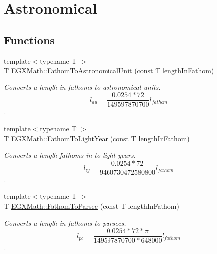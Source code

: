 \hypertarget{group___e_g_x_math-_conversions-_length_conversions-_imperial-_fathom-_astronomical}{}\section{Astronomical}
\label{group___e_g_x_math-_conversions-_length_conversions-_imperial-_fathom-_astronomical}
\subsection*{Functions}
\begin{DoxyCompactItemize}
\item 
{\footnotesize template$<$typename T $>$ }\\T \mbox{\hyperlink{group___e_g_x_math-_conversions-_length_conversions-_imperial-_fathom-_astronomical_gaf453178809cd1255a67509e03dc55f6b}{E\+G\+X\+Math\+::\+Fathom\+To\+Astronomical\+Unit}} (const T length\+In\+Fathom)
\begin{DoxyCompactList}\small\item\em Converts a length in fathoms to astronomical units. \[ l_{au}=\frac{0.0254 * 72}{149597870700} l_{fathom} \]. \end{DoxyCompactList}\item 
{\footnotesize template$<$typename T $>$ }\\T \mbox{\hyperlink{group___e_g_x_math-_conversions-_length_conversions-_imperial-_fathom-_astronomical_gaa45a6119423d8aa6928dd9da3fe553e6}{E\+G\+X\+Math\+::\+Fathom\+To\+Light\+Year}} (const T length\+In\+Fathom)
\begin{DoxyCompactList}\small\item\em Converts a length fathoms in to light-\/years. \[ l_{ly}=\frac{0.0254 * 72}{9460730472580800} l_{fathom} \]. \end{DoxyCompactList}\item 
{\footnotesize template$<$typename T $>$ }\\T \mbox{\hyperlink{group___e_g_x_math-_conversions-_length_conversions-_imperial-_fathom-_astronomical_ga2ab90a2b4e56d3787d12483704d76c2d}{E\+G\+X\+Math\+::\+Fathom\+To\+Parsec}} (const T length\+In\+Fathom)
\begin{DoxyCompactList}\small\item\em Converts a length in fathoms to parsecs. \[ l_{pc}=\frac{0.0254 * 72 * \pi}{149597870700 * 648000} l_{fathom} \]. \end{DoxyCompactList}\end{DoxyCompactItemize}


